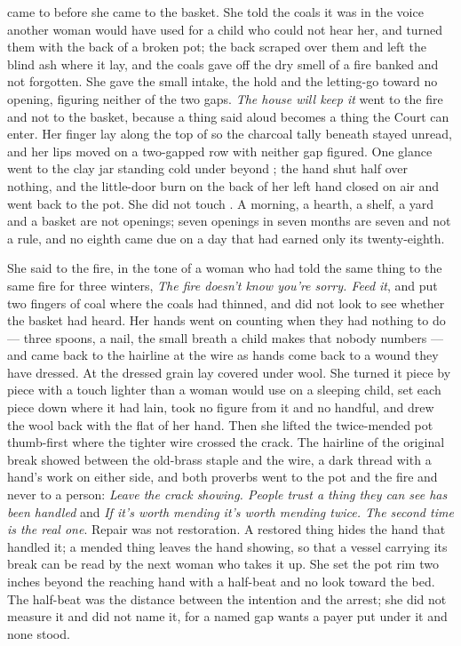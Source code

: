 \scenebreak

 came to  before she came to the basket. She told the coals it was  in the voice another woman would have used for a child who could not hear her, and turned them with the back of a broken pot; the back scraped over them and left the blind ash where it lay, and the coals gave off the dry smell of a fire banked and not forgotten. She gave the small intake, the hold and the letting-go toward no opening, figuring neither of the two gaps. \emph{The house will keep it} went to the fire and not to the basket, because a thing said aloud becomes a thing the Court can enter. Her finger lay along the top of  so the charcoal tally beneath stayed unread, and her lips moved on a two-gapped row with neither gap figured. One glance went to the clay jar standing cold under  beyond ; the hand shut half over nothing, and the little-door burn on the back of her left hand closed on air and went back to the pot. She did not touch . A morning, a hearth, a shelf, a yard and a basket are not openings; seven openings in seven months are seven and not a rule, and no eighth came due on a day that had earned only its twenty-eighth.

She said to the fire, in the tone of a woman who had told the same thing to the same fire for three winters, \emph{The fire doesn't know you're sorry. Feed it}, and put two fingers of coal where the coals had thinned, and did not look to see whether the basket had heard. Her hands went on counting when they had nothing to do --- three spoons, a nail, the small breath a child makes that nobody numbers --- and came back to the hairline at the wire as hands come back to a wound they have dressed. At  the dressed grain lay covered under wool. She turned it piece by piece with a touch lighter than a woman would use on a sleeping child, set each piece down where it had lain, took no figure from it and no handful, and drew the wool back with the flat of her hand. Then she lifted the twice-mended pot thumb-first where the tighter wire crossed the crack. The hairline of the original break showed between the old-brass staple and the wire, a dark thread with a hand's work on either side, and both proverbs went to the pot and the fire and never to a person: \emph{Leave the crack showing. People trust a thing they can see has been handled} and \emph{If it's worth mending it's worth mending twice. The second time is the real one}. Repair was not restoration. A restored thing hides the hand that handled it; a mended thing leaves the hand showing, so that a vessel carrying its break can be read by the next woman who takes it up. She set the pot rim two inches beyond the reaching hand with a half-beat and no look toward the bed. The half-beat was the distance between the intention and the arrest; she did not measure it and did not name it, for a named gap wants a payer put under it and none stood.

